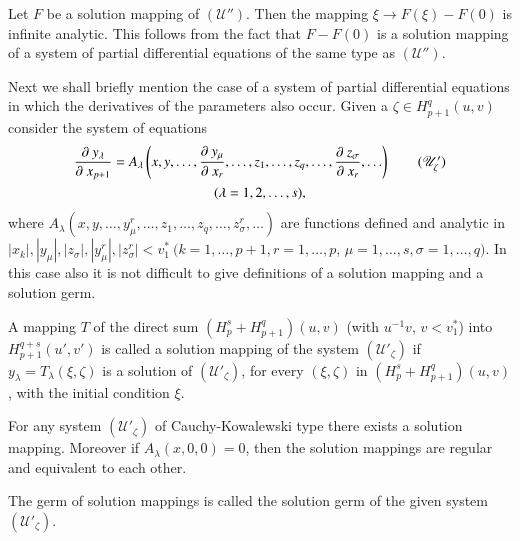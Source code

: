 \begin{remark*}\label{chap1:sec1.9:rem34}%
  Let $F$ be a solution mapping of $(\mathscr{U}'')$. Then the mapping
  $\xi \rightarrow F(\xi) - F(0)$ is infinite analytic. This follows
  from the fact that $F - F(0)$ is a solution mapping of a system of
  partial differential equations of the same type as
  $(\mathscr{U}'')$. 
\end{remark*}

Next we shall briefly mention the case of a system of partial
differential equations in which the derivatives of the parameters also
occur. Given a $\zeta \in H^q_{p+1} (u, v)$ consider the system of
equations 
\begin{gather*}
  \frac{\partial ~ y_\lambda}{\partial ~ x_{p+1}} = A_\lambda \left(x, y,
  \ldots,  \frac{\partial ~y_\mu}{\partial ~ x_r},  \ldots,  z_1,
  \ldots,  z_q,  \ldots,  \frac{\partial ~ z_\sigma}{\partial ~ x_r},
  \ldots\right) \tag{$\mathscr{U}'_\zeta$}\\
  (\lambda = 1,  2,  \ldots,  s), 
\end{gather*}\pageoriginale
where $A_\lambda (x, y,  \ldots,  y_\mu^r,  \ldots,  z_1,  \ldots,
z_q,  \ldots,  z^r_\sigma,  \ldots)$ are functions defined and
analytic in $| x_k |,  |y_\mu |,  |z_\sigma |,  |y^r_\mu |,
|z^r_\sigma | < v^*_1 ~ (k =1,  \ldots,  p+1,  r=1,  \ldots,  p$,  $\mu
=1,  \ldots,  s,  \sigma =1,  \ldots,  q)$. In this case also it is
not difficult to give definitions of a solution mapping and a solution
germ. 

\begin{defi*}%
  A mapping $T$ of the direct sum $(H^s_p + H^q_{p+1}) (u, v)$ (with
  $u^{-1}v$,  $v < v^*_1$) into $H^{q+s}_{p+1} (u',  v')$ is called a
  solution mapping of the system $(\mathscr{U}'_\zeta)$ if $y_\lambda
  = T_\lambda (\xi,  \zeta)$ is a solution of $(\mathscr{U}'_\zeta)$,
  for every $(\xi, \zeta)$ in $(H^s_p + H^q_{p+1}) (u, v)$,  with the
  initial condition $\xi$. 
\end{defi*}

\begin{theorem}\label{chap1:sec1.9:thm5}%
  For any system $(\mathscr{U}'_\zeta)$ of Cauchy-Kowalewski type
  there exists a solution mapping. Moreover if $A_\lambda (x, 0,  0) =
  0$,  then the solution mappings are regular and equivalent to each
  other. 
\end{theorem}

The germ of solution mappings is called the solution germ of the given
system $(\mathscr{U}'_\zeta)$. 

